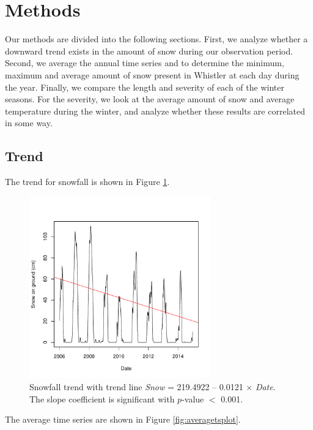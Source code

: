 \documentclass[12pt,twoside]{article}
\begin{document}
{\section{Methods}

Our methods are divided into the following sections. First, we analyze whether a downward trend exists in the amount of snow during our observation period. Second, we average the annual time series and to determine the minimum, maximum and average amount of snow present in Whistler at each day during the year. Finally, we compare the length and severity of each of the winter seasons. For the severity, we look at the average amount of snow and average temperature during the winter, and analyze whether these results are correlated in some way.

\subsection{Trend}

The trend for snowfall is shown in Figure \ref{fig:snowtrend}.


\begin{figure}[!ht]
\begin{center}
\includegraphics[width=0.7\textwidth]{report-snowtrend}
\end{center}
\caption{Snowfall trend with trend line \textsl{Snow} = 219.4922 -- 0.0121 $\times$ \textsl{Date}. The slope coefficient is significant with $p$-value $<$ 0.001.}
\label{fig:snowtrend}
\end{figure}

The average time series are shown in Figure \ref{fig:averagetsplot}. \lipsum[3]


}
\end{document}
